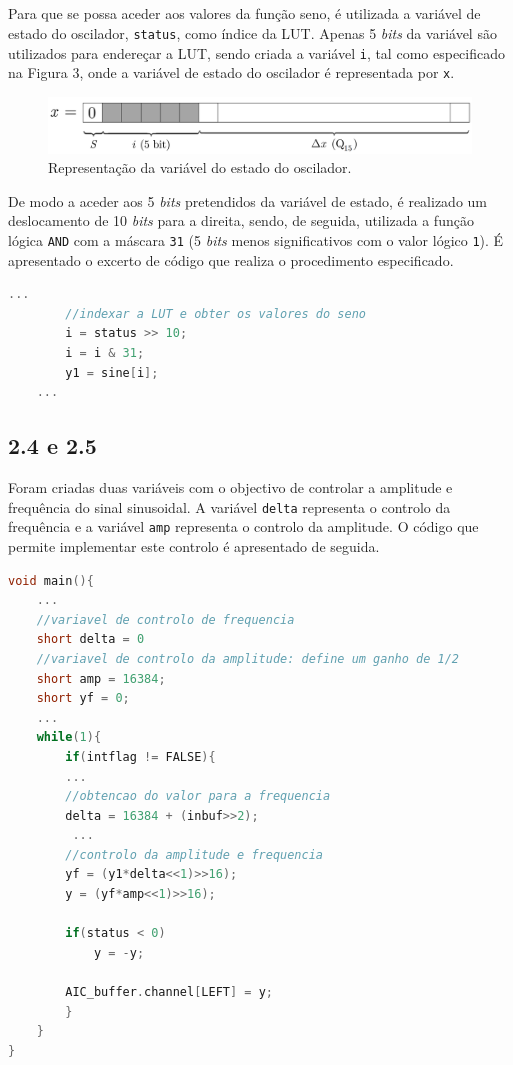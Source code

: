 \documentclass[11pt]{article}
\numberwithin{equation}{section}
\begin{document}
\subsection{} %

Para que se possa aceder aos valores da função seno, é utilizada a variável de estado do oscilador, \texttt{status}, como índice da LUT. Apenas 5 \textit{bits} da variável são utilizados para endereçar a LUT, sendo criada a variável \texttt{i}, tal como especificado na Figura 3, onde a variável de estado do oscilador é representada por \texttt{x}.

\begin{figure}[H]
	\centering
	\includegraphics[keepaspectratio=true, scale=0.27]{teoricas/seno}
	\caption{Representação da variável do estado do oscilador.}
	\vspace{-0.8em}
	\label{fig:variavelestado}
\end{figure}

De modo a aceder aos 5 \textit{bits} pretendidos da variável de estado, é realizado um deslocamento de 10 \textit{bits} para a direita, sendo, de seguida, utilizada a função lógica \texttt{AND} com a máscara \texttt{31} (5 \textit{bits} menos significativos com o valor lógico \texttt{1}). É apresentado o excerto de código que realiza o procedimento especificado. 

\begin{lstlisting}[language=C]
	...
		//indexar a LUT e obter os valores do seno
		i = status >> 10;
		i = i & 31;
		y1 = sine[i]; 
	...
\end{lstlisting}

\subsection*{2.4 e 2.5} %

Foram criadas duas variáveis com o objectivo de controlar a amplitude e frequência do sinal sinusoidal. A variável \texttt{delta} representa o controlo da frequência e a variável \texttt{amp} representa o controlo da amplitude. O código que permite implementar este controlo é apresentado de seguida.  

\begin{lstlisting}[language=C]
void main(){
	...
	//variavel de controlo de frequencia
	short delta = 0
	//variavel de controlo da amplitude: define um ganho de 1/2 
	short amp = 16384; 
	short yf = 0;
	...
	while(1){          
		if(intflag != FALSE){
		...	
		//obtencao do valor para a frequencia		
		delta = 16384 + (inbuf>>2); 
		 ...
		//controlo da amplitude e frequencia
		yf = (y1*delta<<1)>>16);
		y = (yf*amp<<1)>>16);
		
		if(status < 0)
			y = -y;
			
		AIC_buffer.channel[LEFT] = y;
		}
	}
}
\end{lstlisting}
\end{document}
